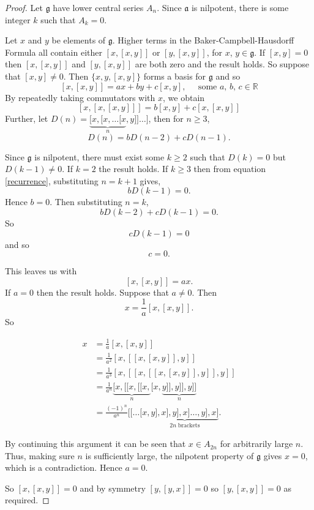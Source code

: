 \documentclass[honours]{UNSWthesis}
\newcommand{\R}{\mathbb{R}}
\newcommand{\g}{\mathfrak{g}}
\newcommand{\1}{\mathbf{e}_{1}}
\newcommand{\2}{\mathbf{e}_{3}}
\newcommand{\3}{\mathbf{e}_{3}}
\begin{document}
\begin{proof} 
Let $\g$ have lower central series $A_{n}$. Since $\mathfrak{a}$ is nilpotent, there is some integer $k$ such that $A_{k}=0$.

Let $x$ and $y$ be elements of $\g$.
Higher terms in the Baker-Campbell-Hausdorff Formula all contain either $[x,[x,y]]$ or $[y,[x,y]]$, for $x$, $y \in \g$. If $[x,y]=0$ then $[x,[x,y]]$ and $[y,[x,y]]$ are both zero and the result holds. So suppose that $[x,y] \neq 0$. Then $\{x,y,[x,y]\}$ forms a basis for $\g$ and so
\[
[x,[x,y]]=ax+by+c[x,y], \;\;\;\;\; \text{some $a$, $b$, $c \in \R$}
\]
By repeatedly taking commutators with $x$, we obtain
\[
[x,[x,[x,y]]]=b[x,y]+c[x,[x,y]]
\]
Further, let $D(n)=\underbrace{[x,[x,\ldots[x}_{n},y]] \ldots ]$, then for $n \geq 3$,
\begin{equation}\label{recurrence}
D(n)=bD(n-2)+cD(n-1).
\end{equation}

Since $\g$ is nilpotent, there must exist some $k \geq 2$ such that $D(k)=0$ but $D(k-1) \neq 0$. If $k=2$ the result holds. If $k \geq 3$ then from equation \ref{recurrence}, substituting $n=k+1$ gives,
\[
bD(k-1)=0
.\] Hence $b=0$.
Then substituting $n=k$,
\[
bD(k-2)+cD(k-1)=0
.\] So
\[
cD(k-1)=0
\] and so
\[
c=0.
\]

This leaves us with 
\[
[x,[x,y]]=ax.
\]
If $a=0$ then the result holds. Suppose that $a \neq 0$. Then $$x=\frac{1}{a}[x,[x,y]].$$ So

\begin{align*}
x &= \frac{1}{a}[x,[x,y]] \\
&= \frac{1}{a^{2}}[x,[[x,[x,y]],y]] \\
&=\frac{1}{a^{3}}[x,[[x,[[x,[x,y]],y]],y]] \\
&=\frac{1}{a^{n}}\underbrace{[x,[[x,[[x,}_{n}[x,\underbrace{y]],y]],y]]}_{n}\\
&=\frac{(-1)^{n}}{a^{n}}[[\ldots[x,\underbrace{y],x],y],x]\ldots,y],x]}_{2n\; \text{brackets}} .
\end{align*}

By continuing this argument it can be seen that $x \in A_{2n}$ for arbitrarily large $n$. Thus, making sure $n$ is sufficiently large, the nilpotent property of $\g$ gives $x=0$, which is a contradiction. Hence $a=0$.

So $[x,[x,y]]=0$ and by symmetry $[y,[y,x]]=0$ so $[y,[x,y]]=0$ as required.
\end{proof}
\end{document}
